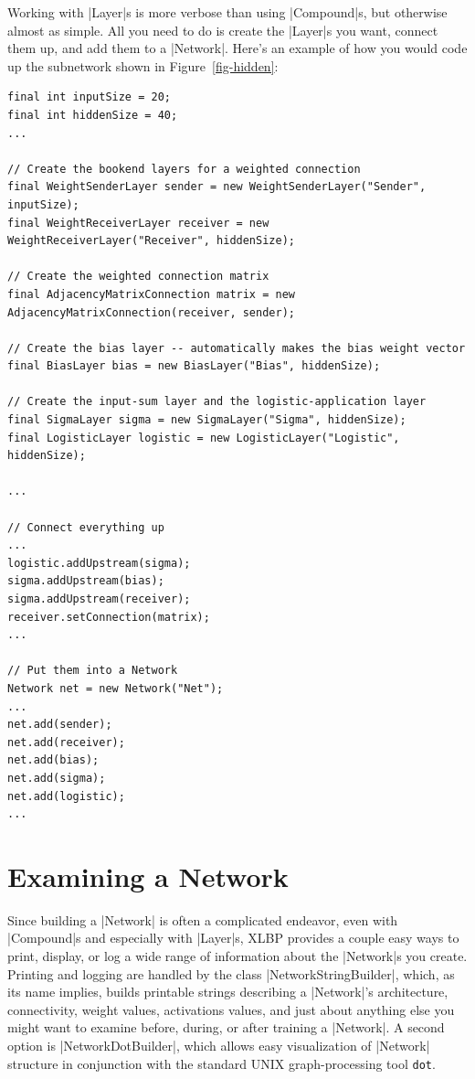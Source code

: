 \documentclass{article}
\newcommand{\figref}[1]{Figure~\ref{#1}}
\begin{document}
Working with |Layer|s is more verbose than using |Compound|s, but otherwise
almost as simple. All you need to do is create the |Layer|s you want, connect them up,
and add them to a |Network|. Here's an example of how you would code up the subnetwork
shown in \figref{fig-hidden}:

\begin{verbatim}
final int inputSize = 20;
final int hiddenSize = 40;
...

// Create the bookend layers for a weighted connection
final WeightSenderLayer sender = new WeightSenderLayer("Sender", inputSize);
final WeightReceiverLayer receiver = new WeightReceiverLayer("Receiver", hiddenSize);

// Create the weighted connection matrix
final AdjacencyMatrixConnection matrix = new AdjacencyMatrixConnection(receiver, sender);

// Create the bias layer -- automatically makes the bias weight vector
final BiasLayer bias = new BiasLayer("Bias", hiddenSize);

// Create the input-sum layer and the logistic-application layer
final SigmaLayer sigma = new SigmaLayer("Sigma", hiddenSize);
final LogisticLayer logistic = new LogisticLayer("Logistic", hiddenSize);

...

// Connect everything up
...
logistic.addUpstream(sigma);
sigma.addUpstream(bias);
sigma.addUpstream(receiver);
receiver.setConnection(matrix);
...

// Put them into a Network
Network net = new Network("Net");
...
net.add(sender);
net.add(receiver);
net.add(bias);
net.add(sigma);
net.add(logistic);
...
\end{verbatim}


\section{Examining a Network}

Since building a |Network| is often a complicated endeavor, even with |Compound|s and especially with |Layer|s, XLBP provides a couple easy ways to print, display, or log a wide range of information about the |Network|s you create. Printing and logging are handled by the class |NetworkStringBuilder|, which, as its name implies, builds printable strings describing a |Network|'s architecture, connectivity, weight values, activations values, and just about anything else you might want to examine before, during, or after training a |Network|. A second option is |NetworkDotBuilder|, which allows easy visualization of |Network| structure in conjunction with the standard UNIX graph-processing tool \texttt{dot}.
\end{document}

